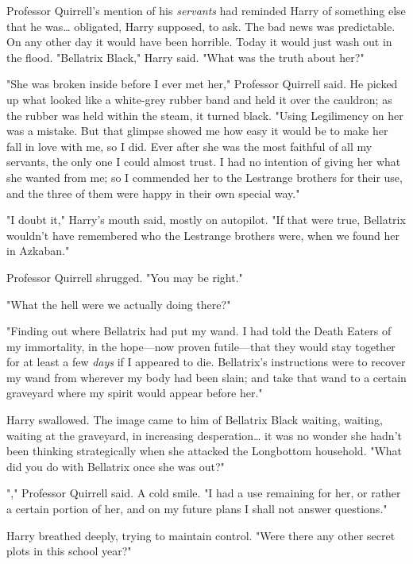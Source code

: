 Professor Quirrell's mention of his \emph{servants} had reminded Harry of
something else that he was{\ldots} obligated, Harry supposed, to ask. The bad
news was predictable. On any other day it would have been horrible. Today it
would just wash out in the flood. "Bellatrix Black," Harry said. "What was the
truth about her?"

"She was broken inside before I ever met her," Professor Quirrell said. He
picked up what looked like a white-grey rubber band and held it over the
cauldron; as the rubber was held within the steam, it turned black. "Using
Legilimency on her was a mistake. But that glimpse showed me how easy it would
be to make her fall in love with me, so I did. Ever after she was the most
faithful of all my servants, the only one I could almost trust. I had no
intention of giving her what she wanted from me; so I commended her to the
Lestrange brothers for their use, and the three of them were happy in their own
special way."

"I doubt it," Harry's mouth said, mostly on autopilot. "If that were true,
Bellatrix wouldn't have remembered who the Lestrange brothers were, when we
found her in Azkaban."

Professor Quirrell shrugged. "You may be right."

"What the hell were we actually doing there?"

"Finding out where Bellatrix had put my wand. I had told the Death Eaters of my
immortality, in the hope---now proven futile---that they would stay together
for at least a few \emph{days} if I appeared to die. Bellatrix's instructions
were to recover my wand from wherever my body had been slain; and take that
wand to a certain graveyard where my spirit would appear before her."

Harry swallowed. The image came to him of Bellatrix Black waiting, waiting,
waiting at the graveyard, in increasing desperation{\ldots} it was no wonder
she hadn't been thinking strategically when she attacked the Longbottom
household. "What did you do with Bellatrix once she was out?"

"," Professor Quirrell
said. A cold smile. "I had a use remaining for her, or rather a certain portion
of her, and on my future plans I shall not answer questions."

Harry breathed deeply, trying to maintain control. "Were there any other secret
plots in this school year?"

